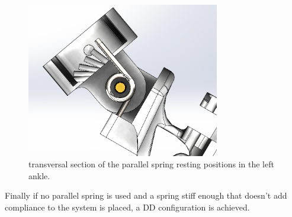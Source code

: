 \begin{figure}[ht!]
	\centering
	\includegraphics[width=0.75\textwidth]{figures/rotational_spring_rest_positions}
	\caption{transversal section of the parallel spring resting positions in the left ankle.}
	\label{fig:rotational_spring_rest_position}
\end{figure}

Finally if no parallel spring is used and a spring stiff enough that doesn't add compliance to the system is placed, a DD configuration is achieved.
